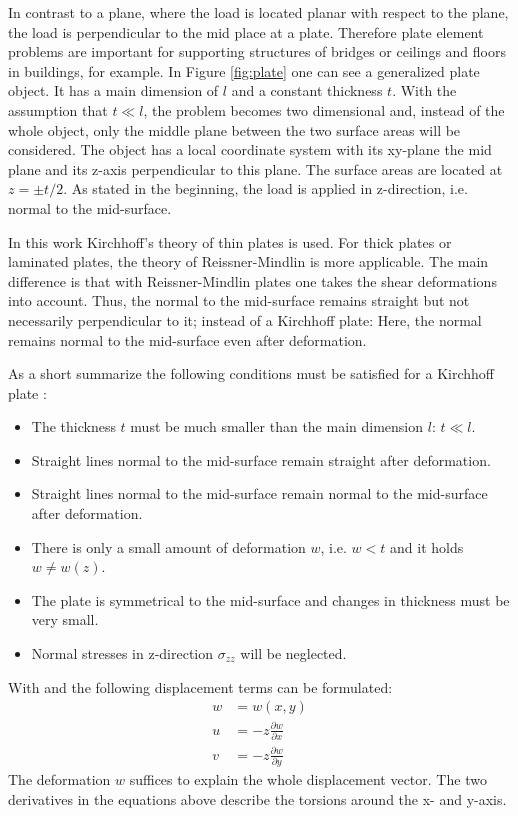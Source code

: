   In contrast to a plane, where the load is located planar with respect to the plane, the load is perpendicular to the mid place at a plate. Therefore plate element problems are important for supporting structures of bridges or ceilings and floors in buildings, for example. In Figure \ref{fig:plate} one can see a generalized plate object. It has a main dimension of $l$ and a constant thickness $t$. With the assumption that $t \ll l$, the problem becomes two dimensional and, instead of the whole object, only the middle plane between the two surface areas will be considered. The object has a local coordinate system with its xy-plane the mid plane and its z-axis perpendicular to this plane. The surface areas are located at $z = \pm t/2$. As stated in the beginning, the load is applied in z-direction, i.e. normal to the mid-surface.
  
  In this work Kirchhoff's theory of thin plates is used. For thick plates or laminated plates, the theory of Reissner-Mindlin is more applicable. The main difference is that with Reissner-Mindlin plates one takes the shear deformations into account. Thus, the normal to the mid-surface remains straight but not necessarily perpendicular to it; instead of a Kirchhoff plate: Here, the normal remains normal to the mid-surface even after deformation.
  
  As a short summarize the following conditions must be satisfied for a Kirchhoff plate \cite{steinke2005finite}:
  \begin{itemize}
  	\item The thickness $t$ must be much smaller than the main dimension $l$: $t \ll l$.
  	\item Straight lines normal to the mid-surface remain straight after deformation.
  	\item Straight lines normal to the mid-surface remain normal to the mid-surface after deformation.
  	\item There is only a small amount of deformation $w$, i.e. $w < t$ and it holds $w \ne w(z)$.
  	\item The plate is symmetrical to the mid-surface and changes in thickness must be very small.
  	\item Normal stresses in z-direction $\sigma_{zz}$ will be neglected.
  \end{itemize}
  
  With \cite{klein2013fem} and \cite{steinke2005finite} the following displacement terms can be formulated:
  \begin{align}
  w &= w(x,y) \\
  u &= -z \frac{\partial w}{\partial x}\\
  v &= -z \frac{\partial w}{\partial y}
  \end{align}
  The deformation $w$ suffices to explain the whole displacement vector. The two derivatives in the equations above describe the torsions around the x- and y-axis.

